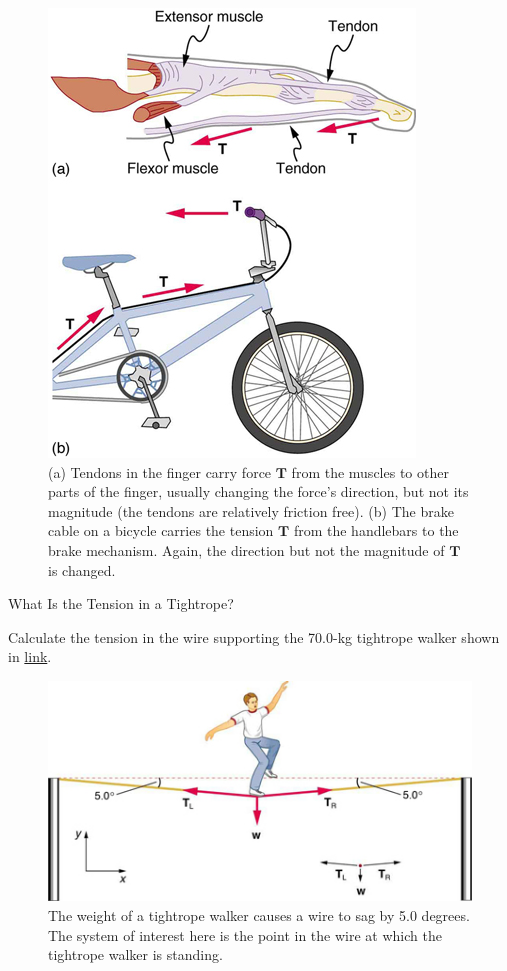 \documentclass[
]{book}
\begin{document}
\begin{figure}
\hypertarget{import-auto-id1318288}{%
\centering
\includegraphics{images/Figure_04_05_05.jpg}
\caption{(a) Tendons in the finger carry force \(\textbf{T}{}\) from the muscles
to other parts of the finger, usually changing the force's direction,
but not its magnitude (the tendons are relatively friction free). (b)
The brake cable on a bicycle carries the tension \(\textbf{T}{}\) from the
handlebars to the brake mechanism. Again, the direction but not the
magnitude of \(\textbf{T}{}\) is
changed.}\label{import-auto-id1318288}
}
\end{figure}

\hypertarget{fs-id986136}{}
What Is the Tension in a Tightrope?

Calculate the tension in the wire supporting the 70.0-kg tightrope
walker shown in \protect\hyperlink{import-auto-id2091042}{link}.

\begin{figure}
\hypertarget{import-auto-id2091042}{%
\centering
\includegraphics{images/Figure_04_05_06.jpg}
\caption{The weight of a tightrope walker causes a wire to sag by 5.0 degrees.
The system of interest here is the point in the wire at which the
tightrope walker is
standing.}\label{import-auto-id2091042}
}
\end{figure}
\end{document}
